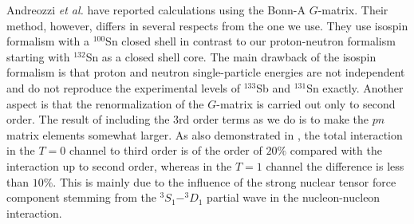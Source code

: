 \documentclass[aps,twocolumn,superscriptaddress,prc,showpacs]{revtex4}
\begin{document}
Andreozzi {\em et al.} \cite{And98} have reported calculations     
using the Bonn-A $  G  $-matrix. Their method, however, differs
in several respects from the one we use. They use isospin
formalism with a $^{100}$Sn closed shell in contrast to
our proton-neutron formalism starting with $^{132}$Sn
as a closed shell core.
The main drawback of the isospin formalism is that
proton and neutron single-particle energies are not
independent and do not reproduce the experimental
levels of $^{133}$Sb and $^{131}$Sn exactly. Another
aspect is that the renormalization of the $  G  $-matrix is
carried out only to second order. The result of
including the 3rd order terms as we do is to make the
$  pn  $ matrix elements somewhat larger.
As also demonstrated in \cite{hko95},
the total interaction
in the $  T=0  $ channel to third order is of the
order of $  20\%  $ compared  with the interaction
up to second order, whereas in the $  T=1  $ channel the difference
is less than $  10\%  $. This is mainly due to the
influence of the strong nuclear tensor force
component stemming from the $  ^{3}S_{1}-^{3}D_{1}  $ partial wave
in the nucleon-nucleon interaction.
\end{document}
